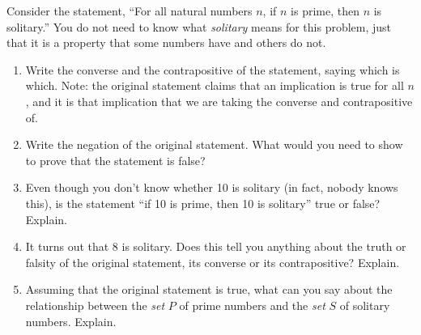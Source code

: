 \documentclass[11pt,]{book}
\theoremstyle{ptxplainnotitle}
\theoremstyle{ptxplaintitle}
\theoremstyle{ptxdefinitionnotitle}
\theoremstyle{ptxdefinitiontitle}
\theoremstyle{ptxdefinitionnotitle}
\theoremstyle{ptxdefinitiontitle}
\theoremstyle{ptxdefinitionnotitle}
\theoremstyle{ptxdefinitiontitle}
\theoremstyle{ptxdefinitiontitlenonumber}
\theoremstyle{ptxdefinitiontitlenonumber}
\numberwithin{equation}{chapter}
\begin{document}
\begin{divisionexercise}{22}\hypertarget{exercise-170}{}
\hypertarget{p-2360}{}%
Consider the statement, ``For all natural numbers \(n\), if \(n\) is prime, then \(n\) is solitary.''  You do not need to know what \emph{solitary} means for this problem, just that it is a property that some numbers have and others do not.%
\begin{enumerate}[font=\bfseries,label=(\alph*),ref=\alph*]
\item\label{task-1} \hypertarget{p-2361}{}%
Write the converse and the contrapositive of the statement, saying which is which.  Note: the original statement claims that an implication is true for all \(n\), and it is that implication that we are taking the converse and contrapositive of.%
\item\label{task-2} \hypertarget{p-2363}{}%
Write the negation of the original statement.  What would you need to show to prove that the statement is false?%
\item\label{task-3} \hypertarget{p-2365}{}%
Even though you don't know whether 10 is solitary (in fact, nobody knows this), is the statement ``if 10 is prime, then 10 is solitary'' true or false?  Explain.%
\item\label{task-4} \hypertarget{p-2367}{}%
It turns out that 8 is solitary.  Does this tell you anything about the truth or falsity of the original statement, its converse or its contrapositive?  Explain.%
\item\label{task-5} \hypertarget{p-2369}{}%
Assuming that the original statement is true, what can you say about the relationship between the \emph{set} \(P\) of prime numbers and the \emph{set} \(S\) of solitary numbers.  Explain.%
\end{enumerate}
\end{divisionexercise}%
\typeout{************************************************}
\typeout{************************************************}
\end{document}
